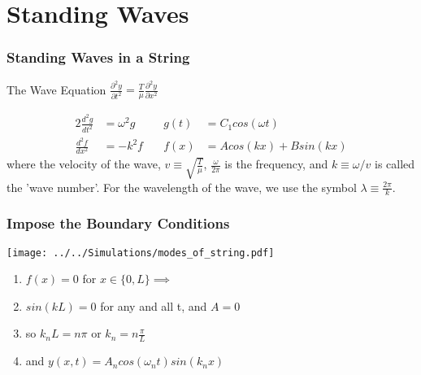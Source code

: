 \documentclass[pdf, handout, hideothersubsections]{beamer}
\begin{document}
\section{Standing Waves}
\begin{frame}
\frametitle{Standing Waves in a String}
\begin{block}{The Wave Equation}
\centering
$ \frac{\partial^2 y}{\partial t^2} = \frac{T}{\mu} \frac{\partial^2 y}{\partial x^2}$
\end{block}
\pause
\begin{alignat}{2}
\frac{d^2 g}{dt^2} &= \omega^2 g  &\quad g(t) &= C_1 cos(\omega t) \\
\frac{d^2 f}{dx^2} &= -k^2 f &\quad f(x) &= A cos(k x) + B
sin(k x) 
\end{alignat}
\pause
where the velocity of the wave, $v \equiv \sqrt{\frac{T}{\mu}}$,
$\frac{\omega}{2 \pi}$ is the frequency, and $k \equiv \omega / v$ is
called the 'wave number'. For the wavelength of the wave, we use the
symbol $\lambda \equiv \frac{2 \pi}{k}$.
\end{frame}

\begin{frame}
\frametitle{Impose the Boundary Conditions}
\begin{centering}
\texttt{[image: ../../Simulations/modes\_of\_string.pdf]}
\end{centering}
    \begin{enumerate}
    \item $f(x) = 0$ for $x \in \{0, L\} \implies$
      \pause
    \item $sin(k L) = 0$ for any and all t, and $A = 0$
      \pause
    \item so $k_n L = n \pi$ or $k_n = n \frac{\pi}{L}$
      \pause
    \item and $y(x, t) = A_n cos(\omega_n t) sin(k_n x)$
    \end{enumerate}
\end{frame}







\end{document}

